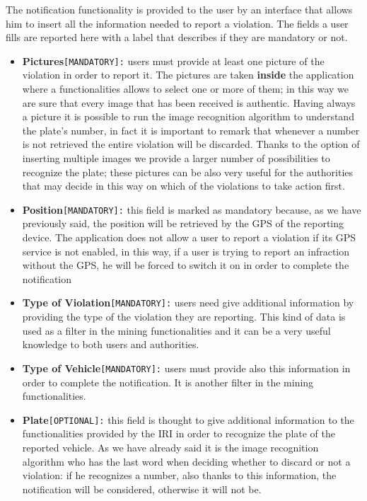 		The notification functionality is provided to the user by an interface that allows him to insert all the information needed to report a violation. The fields a user fills are reported here with a label that describes if they are mandatory or not.
		
		\begin{itemize}
			\item \textbf{Pictures}\texttt{[MANDATORY]:} users must provide at least one picture of the violation in order to report it. The pictures are taken \textbf{inside} the application where a functionalities allows to select one or more of them; in this way we are sure that every image that has been received is authentic. Having always a picture it is possible to run the image recognition algorithm to understand the plate's number, in fact it is important to remark that whenever a number is not retrieved the entire violation will be discarded. Thanks to the option of inserting multiple images we provide a larger number of possibilities to recognize the plate; these pictures can be also very useful for the authorities that may decide in this way on which of the violations to take action first.
			
			\item \textbf{Position}\texttt{[MANDATORY]:} this field is marked as mandatory because, as we have previously said, the position will be retrieved by the GPS of the reporting device. The application does not allow a user to report a violation if its GPS service is not enabled, in this way, if a user is trying to report an infraction without the GPS, he will be forced to switch it on in order to complete the notification
			
			\item \textbf{Type of Violation}\texttt{[MANDATORY]:} users need give additional information by providing the type of the violation they are reporting. This kind of data is used as a filter in the mining functionalities and it can be a very useful knowledge to both users and authorities.
			
			\item \textbf{Type of Vehicle}\texttt{[MANDATORY]:} users must provide also this information in order to complete the notification. It is another filter in the mining functionalities.
			
			\item \textbf{Plate}\texttt{[OPTIONAL]:} this field is thought to give additional information to the functionalities provided by the IRI in order to recognize the plate of the reported vehicle. As we have already said it is the image recognition algorithm who has the last word when deciding whether to discard or not a violation: if he recognizes a number, also thanks to this information, the notification will be considered, otherwise it will not be.
		\end{itemize}
	
